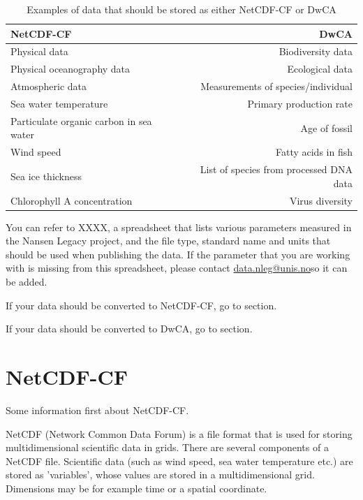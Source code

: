 \documentclass[a4paper,english, 11pt]{article}
\makeatletter
\newcommand{\emailme}{\href{mailto:data.nleg@unis.no}{data.nleg@unis.no}}
\makeatother
\begin{document}
\begin{table}[h!]
  \begin{center}
    \label{t:netcdf_vs_dwca}
    \begin{tabular}{l|r} %
      \textbf{NetCDF-CF} & \textbf{DwCA}\\
      \hline
      Physical data & Biodiversity data\\
      Physical oceanography data & Ecological data\\
      Atmospheric data & Measurements of species/individual\\
      Sea water temperature & Primary production rate\\
      Particulate organic carbon in sea water & Age of fossil\\
      Wind speed & Fatty acids in fish\\
      Sea ice thickness & List of species from processed DNA data\\
      Chlorophyll A concentration & Virus diversity\\
      
    \end{tabular}
    \caption{Examples of data that should be stored as either NetCDF-CF or DwCA}
  \end{center}
\end{table}

You can refer to XXXX, a spreadsheet that lists various parameters measured in the Nansen Legacy project, and the file type, standard name and units that should be used when publishing the data. If the parameter that you are working with is missing from this spreadsheet, please contact \emailme so it can be added.

If your data should be converted to NetCDF-CF, go to section.

If your data should be converted to DwCA, go to section.

\section{NetCDF-CF}
\label{s:NetCDF-CF}

Some information first about NetCDF-CF. 

NetCDF (Network Common Data Forum) is a file format that is used for storing multidimensional scientific data in grids. There are several components of a NetCDF file. Scientific data (such as wind speed, sea water temperature etc.) are stored as 'variables', whose values are stored in a multidimensional grid. Dimensions may be for example time or a spatial coordinate.
\end{document}
